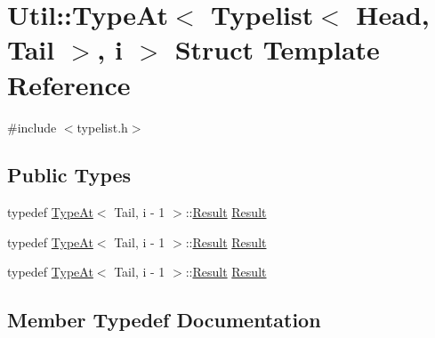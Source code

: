 \hypertarget{structUtil_1_1TL_1_1TypeAt_3_01Typelist_3_01Head_00_01Tail_01_4_00_01i_01_4}{}\section{Util\+:\+:Type\+At$<$ Typelist$<$ Head, Tail $>$, i $>$ Struct Template Reference}
\label{structUtil_1_1TL_1_1TypeAt_3_01Typelist_3_01Head_00_01Tail_01_4_00_01i_01_4}


{\ttfamily \#include $<$typelist.\+h$>$}

\subsection*{Public Types}
\begin{DoxyCompactItemize}
\item 
typedef \mbox{\hyperlink{structUtil_1_1TL_1_1TypeAt}{Type\+At}}$<$ Tail, i -\/ 1 $>$\+::\mbox{\hyperlink{structUtil_1_1TL_1_1TypeAt_3_01Typelist_3_01Head_00_01Tail_01_4_00_01i_01_4_a7ab37564c4bf2d9cfb10c84967788c5c}{Result}} \mbox{\hyperlink{structUtil_1_1TL_1_1TypeAt_3_01Typelist_3_01Head_00_01Tail_01_4_00_01i_01_4_a7ab37564c4bf2d9cfb10c84967788c5c}{Result}}
\item 
typedef \mbox{\hyperlink{structUtil_1_1TL_1_1TypeAt}{Type\+At}}$<$ Tail, i -\/ 1 $>$\+::\mbox{\hyperlink{structUtil_1_1TL_1_1TypeAt_3_01Typelist_3_01Head_00_01Tail_01_4_00_01i_01_4_a7ab37564c4bf2d9cfb10c84967788c5c}{Result}} \mbox{\hyperlink{structUtil_1_1TL_1_1TypeAt_3_01Typelist_3_01Head_00_01Tail_01_4_00_01i_01_4_a7ab37564c4bf2d9cfb10c84967788c5c}{Result}}
\item 
typedef \mbox{\hyperlink{structUtil_1_1TL_1_1TypeAt}{Type\+At}}$<$ Tail, i -\/ 1 $>$\+::\mbox{\hyperlink{structUtil_1_1TL_1_1TypeAt_3_01Typelist_3_01Head_00_01Tail_01_4_00_01i_01_4_a7ab37564c4bf2d9cfb10c84967788c5c}{Result}} \mbox{\hyperlink{structUtil_1_1TL_1_1TypeAt_3_01Typelist_3_01Head_00_01Tail_01_4_00_01i_01_4_a7ab37564c4bf2d9cfb10c84967788c5c}{Result}}
\end{DoxyCompactItemize}


\subsection{Member Typedef Documentation}
\mbox{\label{structUtil_1_1TL_1_1TypeAt_3_01Typelist_3_01Head_00_01Tail_01_4_00_01i_01_4_a7ab37564c4bf2d9cfb10c84967788c5c}} 
